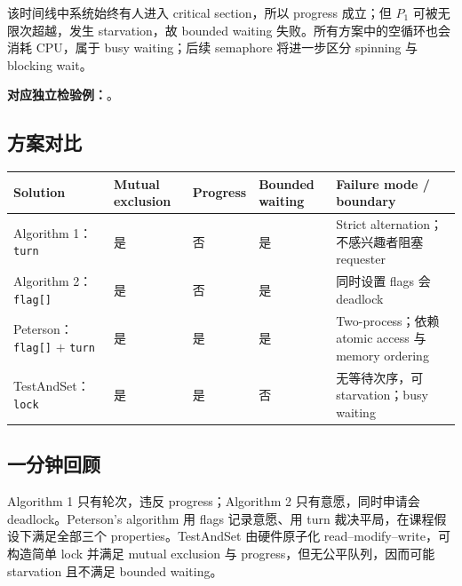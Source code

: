该时间线中系统始终有人进入 critical section，所以 progress 成立；但 $P_1$ 可被无限次超越，发生 starvation，故 bounded waiting 失败。所有方案中的空循环也会消耗 CPU，属于 busy waiting；后续 semaphore 将进一步区分 spinning 与 blocking wait。

\textbf{对应独立检验例：}。

\subsection{方案对比}

\begin{center}
\small
\begin{tabularx}{0.98\textwidth}{@{}>{\raggedright\arraybackslash}p{2.9cm}>{\centering\arraybackslash}p{1.6cm}>{\centering\arraybackslash}p{1.35cm}>{\centering\arraybackslash}p{1.75cm}X@{}}
  \toprule
  Solution & Mutual exclusion & Progress & Bounded waiting & Failure mode / boundary \\
  \midrule
  Algorithm 1：\texttt{turn} & 是 & 否 & 是 & Strict alternation；不感兴趣者阻塞 requester \\
  Algorithm 2：\texttt{flag[]} & 是 & 否 & 是 & 同时设置 flags 会 deadlock \\
  Peterson：\texttt{flag[]} $+$ \texttt{turn} & 是 & 是 & 是 & Two-process；依赖 atomic access 与 memory ordering \\
  TestAndSet：\texttt{lock} & 是 & 是 & 否 & 无等待次序，可 starvation；busy waiting \\
  \bottomrule
\end{tabularx}
\end{center}

\subsection{一分钟回顾}

Algorithm 1 只有轮次，违反 progress；Algorithm 2 只有意愿，同时申请会 deadlock。Peterson's algorithm 用 flags 记录意愿、用 turn 裁决平局，在课程假设下满足全部三个 properties。TestAndSet 由硬件原子化 read--modify--write，可构造简单 lock 并满足 mutual exclusion 与 progress，但无公平队列，因而可能 starvation 且不满足 bounded waiting。
